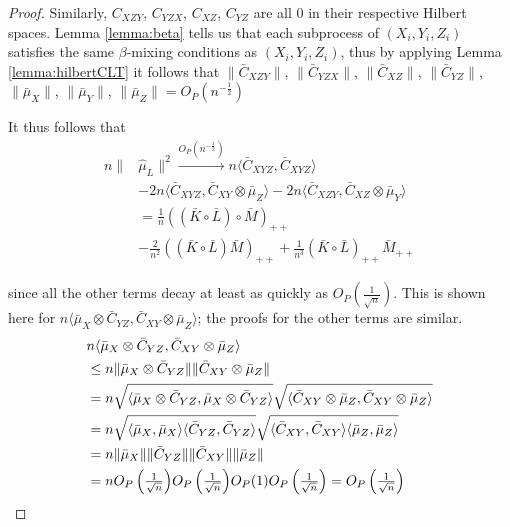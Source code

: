 \documentclass[]{article}
\begin{document}
\begin{proof}
Similarly, $C_{XZY}$, $C_{YZX}$, $C_{XZ}$, $C_{YZ}$ are all 0 in their respective Hilbert spaces. Lemma \ref{lemma:beta} tells us that each subprocess of $(X_i,Y_i,Z_i)$ satisfies the same $\beta$-mixing conditions as $(X_i,Y_i,Z_i)$, thus by applying Lemma \ref{lemma:hilbertCLT} it follows that $\|\bar{C}_{XZY}\|$, $\|\bar{C}_{YZX}\|$, $\|\bar{C}_{XZ}\|$, $\|\bar{C}_{YZ}\|$, $\|\bar{\mu}_X\|$, $\|\bar{\mu}_Y\|$, $\|\bar{\mu}_Z\| = O_P\left(n^{-\frac{1}{2}}\right)$

It thus follows that
\begin{align*}
n\|&\hat \mu_L\|^2  \xrightarrow{O_P(n^{-\frac{1}{2}})} n\langle \bar{C}_{XYZ},\bar{C}_{XYZ} \rangle \\ &-
2n\langle \bar{C}_{XYZ},\bar{C}_{XY}\otimes\bar{\mu}_Z \rangle -
2n\langle \bar{C}_{XZY},\bar{C}_{XZ}\otimes\bar{\mu}_Y \rangle \\ &=
\frac{1}{n}((\bar{K}\circ \bar{L}) \circ \bar{M})_{++}\\& - \frac{2}{n^2}((\bar{K}\circ \bar{L})\bar{M})_{++} + \frac{1}{n^3}(\bar{K}\circ \bar{L})_{++}\bar{M}_{++}
\end{align*}

since all the other terms decay at least as quickly as $O_P(\frac{1}{\sqrt{n}})$. This is shown here for $n\langle \bar{\mu}_X\otimes\bar{C}_{YZ},\bar{C}_{XY}\otimes\bar{\mu}_Z \rangle$; the proofs for the other terms are similar.
\begin{align*}
&n\langle \bar{\mu}_X\otimes\bar{C}_{YZ},\bar{C}_{XY}\otimes\bar{\mu}_Z \rangle \\
&\leq n \| \bar{\mu}_X\otimes\bar{C}_{YZ}\| \|\bar{C}_{XY}\otimes\bar{\mu}_Z \| \\
& = n\sqrt{\langle \bar{\mu}_X\otimes\bar{C}_{YZ} , \bar{\mu}_X\otimes\bar{C}_{YZ} \rangle} \sqrt{\langle \bar{C}_{XY}\otimes\bar{\mu}_Z, \bar{C}_{XY}\otimes\bar{\mu}_Z \rangle} \\
& = n\sqrt{\langle \bar{\mu}_X, \bar{\mu}_X \rangle \langle \bar{C}_{YZ} , \bar{C}_{YZ} \rangle} \sqrt{\langle \bar{C}_{XY}, \bar{C}_{XY} \rangle \langle \bar{\mu}_Z, \bar{\mu}_Z \rangle} \\
& =  n \| \bar{\mu}_X\|\|\bar{C}_{YZ}\| \|\bar{C}_{XY}\|\|\bar{\mu}_Z \| \\
& = n \mathsmaller{O_P\left(\frac{1}{\sqrt{n}}\right)} \mathsmaller{O_P\left(\frac{1}{\sqrt{n}}\right)} O_P(1) \mathsmaller{O_P\left(\frac{1}{\sqrt{n}}\right)} = \mathsmaller{O_P\left(\frac{1}{\sqrt{n}}\right)}
\end{align*}


\end{proof}
\end{document}
